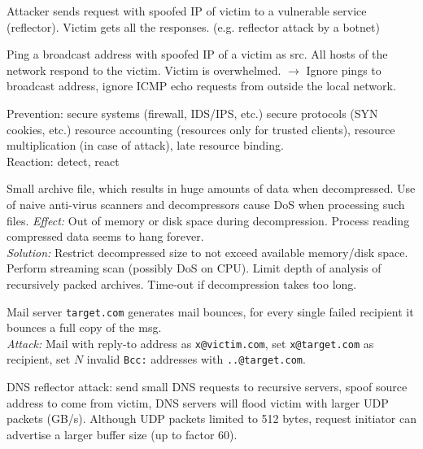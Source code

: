  Attacker sends request with spoofed IP of victim to a vulnerable service (reflector). Victim gets all the responses. (e.g. reflector attack by a botnet) 

 Ping a broadcast address with spoofed IP of a victim as src. All hosts of the network respond to the victim. Victim is overwhelmed. $\to$ Ignore pings to broadcast address, ignore ICMP echo requests from outside the local network.

 Prevention: secure systems (firewall, IDS/IPS, etc.) secure protocols (SYN cookies, etc.) resource accounting (resources only for trusted clients), resource multiplication (in case of attack), late resource binding.\\
Reaction: detect, react

 Small archive file, which results in huge amounts of data when decompressed. Use of naive anti-virus scanners and decompressors cause DoS when processing such files. \textit{Effect:} Out of memory or disk space during decompression. Process reading compressed data seems to hang forever.\\
\textit{Solution:} Restrict decompressed size to not exceed available memory/disk space. Perform streaming scan (possibly DoS on CPU). Limit depth of analysis of recursively packed archives. Time-out if decompression takes too long.

 Mail server {\tt target.com} generates mail bounces, for every single failed recipient it bounces a full copy of the msg.\\
\textit{Attack:} Mail with reply-to address as {\tt x@victim.com}, set {\tt x@target.com} as recipient, set $N$ invalid {\tt Bcc:} addresses with {\tt ..@target.com}.

 DNS reflector attack: send small DNS requests to recursive servers, spoof source address to come from victim, DNS servers will flood victim with larger UDP packets (GB/s). Although UDP packets limited to 512 bytes, request initiator can advertise a larger buffer size (up to factor 60).
